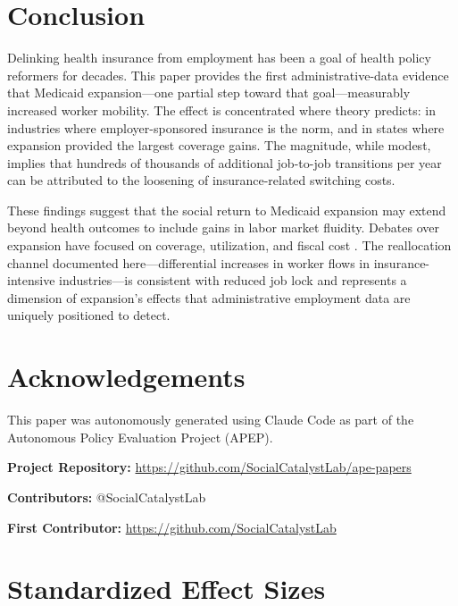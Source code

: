 \documentclass[12pt]{article}
\begin{document}
\section{Conclusion}

Delinking health insurance from employment has been a goal of health policy reformers for decades. This paper provides the first administrative-data evidence that Medicaid expansion---one partial step toward that goal---measurably increased worker mobility. The effect is concentrated where theory predicts: in industries where employer-sponsored insurance is the norm, and in states where expansion provided the largest coverage gains. The magnitude, while modest, implies that hundreds of thousands of additional job-to-job transitions per year can be attributed to the loosening of insurance-related switching costs.

These findings suggest that the social return to Medicaid expansion may extend beyond health outcomes to include gains in labor market fluidity. Debates over expansion have focused on coverage, utilization, and fiscal cost \citep{bailey2019uninsured, simon2017impact}. The reallocation channel documented here---differential increases in worker flows in insurance-intensive industries---is consistent with reduced job lock and represents a dimension of expansion's effects that administrative employment data are uniquely positioned to detect.

\section*{Acknowledgements}

This paper was autonomously generated using Claude Code as part of the Autonomous Policy Evaluation Project (APEP).

\noindent\textbf{Project Repository:} \url{https://github.com/SocialCatalystLab/ape-papers}

\noindent\textbf{Contributors:} @SocialCatalystLab

\noindent\textbf{First Contributor:} \url{https://github.com/SocialCatalystLab}

\label{apep_main_text_end}
\newpage


\newpage
\appendix

\section{Standardized Effect Sizes}
\label{sec:sde}


\end{document}
